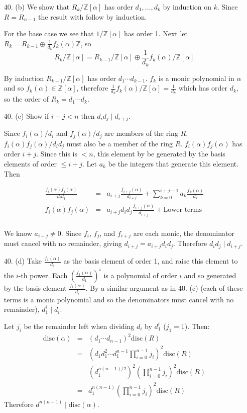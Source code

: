 \documentclass{article}
\newcommand{\Z}[0]{\mathbb{Z}}
\newcommand{\disc}[1]{\text{disc}(#1)}
\begin{document}
\begin{enumerate}
\item[40. (b)] We show that $R_{k} / \Z[\alpha]$ has order $d_1, \ldots, d_k$ by induction on $k$.  Since $R = R_{n-1}$ the result with follow by induction.

For the base case we see that $1 / \Z[\alpha]$ has order 1.  Next let $R_{k} = R_{k-1} \oplus\frac{1}{d_k} f_k(\alpha) \Z$, so \[ R_{k} / \Z[\alpha] = R_{k-1}/\Z[\alpha] \oplus \frac{1}{d_k} f_k(\alpha)/\Z[\alpha] \]

By induction $R_{k-1}/\Z[\alpha]$ has order $d_1\cdots d_{k-1}$.  $f_{k}$ is a monic polynomial in $\alpha$ and so $f_k(\alpha) \in \Z[\alpha]$, therefore $\frac{1}{d_k} f_k(\alpha)/\Z[\alpha] = \frac{1}{d_k}$ which has order $d_k$, so the order of $R_k = d_1 \cdots d_{k}$.

\item[40. (c)] Show if $i + j < n$ then $d_i d_j \mid d_{i+j}$.

Since $f_i(\alpha) / d_i$ and $f_j(\alpha) / d_j$ are members of the ring $R$, $f_i(\alpha)f_j(\alpha) / d_i d_j$ must also be a member of the ring $R$.  $f_i(\alpha)f_j(\alpha)$ has order $i + j$.  Since this is $< n$, this element by be generated by the basis elements of order $\le i + j$.  Let $a_{k}$ be the integers that generate this element.  Then

\begin{eqnarray*}
    \frac{f_i(\alpha)f_j(\alpha)}{d_i d_j} &=& a_{i+j}\frac{f_{i+j}(\alpha)}{d_{i+j}} + \sum_{k = 0}^{i + j - 1} a_k \frac{f_{k}(\alpha)}{d_k} \\
    f_i(\alpha)f_j(\alpha) &=& a_{i+j}d_{i}d_{j}\frac{f_{i+j}(\alpha)}{d_{i+j}} + \text{Lower terms} \\
\end{eqnarray*}

We know $a_{i+j} \neq 0$.  Since $f_i$, $f_j$, and $f_{i+j}$ are each monic, the denominator must cancel with no remainder, giving $d_{i+j} = a_{i+j} d_i d_j$.  Therefore $d_i d_j \mid d_{i+j}$.

\item[40. (d)] Take $\frac{f_1(\alpha)}{d_1}$ as the basis element of order 1, and raise this element to the $i$-th power.  Each $(\frac{f_1(\alpha)}{d_1})^i$ is a polynomial of order $i$ and so generated by the basis element $\frac{f_i(\alpha)}{d_i}$.  By a similar argument as in 40. (c) (each of these terms is a monic polynomial and so the denominators must cancel with no remainder), $d_1^i \mid d_i$.

Let $j_i$ be the remainder left when dividing $d_i$ by $d_1^i$ ($j_1 = 1$).  Then:
\begin{eqnarray*}
    \disc{\alpha} &=& (d_1 \cdots d_{n-1})^2 \disc{R} \\
                  &=& (d_1 d_1^2 \cdots d_1^{n-1} \prod_{i=0}^{n-1} j_i)^2 \disc{R} \\
                  &=& (d_1^{n(n-1)/2})^2 (\prod_{i=0}^{n-1} j_i)^2 \disc{R}\\
                  &=& d_1^{n(n-1)} (\prod_{i=0}^{n-1} j_i)^2 \disc{R}
\end{eqnarray*}
Therefore $d^{n(n-1)} \mid \disc{\alpha}$.


\end{enumerate}
\end{document}
